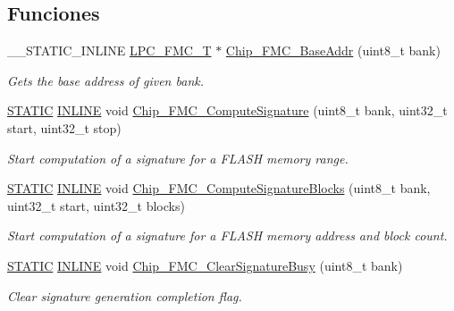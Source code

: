 \subsection*{Funciones}
\begin{DoxyCompactItemize}
\item 
\+\_\+\+\_\+\+S\+T\+A\+T\+I\+C\+\_\+\+I\+N\+L\+I\+NE \hyperlink{struct_l_p_c___f_m_c___t}{L\+P\+C\+\_\+\+F\+M\+C\+\_\+T} $\ast$ \hyperlink{group___f_m_c__18_x_x__43_x_x_ga0108061af4fc0814b1d3e2b5b1fc5579}{Chip\+\_\+\+F\+M\+C\+\_\+\+Base\+Addr} (uint8\+\_\+t bank)
\begin{DoxyCompactList}\small\item\em Gets the base address of given bank. \end{DoxyCompactList}\item 
\hyperlink{group___l_p_c___types___public___macros_ga10b2d890d871e1489bb02b7e70d9bdfb}{S\+T\+A\+T\+IC} \hyperlink{spifi__18xx__43xx_8h_a2eb6f9e0395b47b8d5e3eeae4fe0c116}{I\+N\+L\+I\+NE} void \hyperlink{group___f_m_c__18_x_x__43_x_x_ga743dd8b5f2e568d1bcf6d641b4587a3c}{Chip\+\_\+\+F\+M\+C\+\_\+\+Compute\+Signature} (uint8\+\_\+t bank, uint32\+\_\+t start, uint32\+\_\+t stop)
\begin{DoxyCompactList}\small\item\em Start computation of a signature for a F\+L\+A\+SH memory range. \end{DoxyCompactList}\item 
\hyperlink{group___l_p_c___types___public___macros_ga10b2d890d871e1489bb02b7e70d9bdfb}{S\+T\+A\+T\+IC} \hyperlink{spifi__18xx__43xx_8h_a2eb6f9e0395b47b8d5e3eeae4fe0c116}{I\+N\+L\+I\+NE} void \hyperlink{group___f_m_c__18_x_x__43_x_x_ga413d32194e2866d17bcc98d942fc4dd1}{Chip\+\_\+\+F\+M\+C\+\_\+\+Compute\+Signature\+Blocks} (uint8\+\_\+t bank, uint32\+\_\+t start, uint32\+\_\+t blocks)
\begin{DoxyCompactList}\small\item\em Start computation of a signature for a F\+L\+A\+SH memory address and block count. \end{DoxyCompactList}\item 
\hyperlink{group___l_p_c___types___public___macros_ga10b2d890d871e1489bb02b7e70d9bdfb}{S\+T\+A\+T\+IC} \hyperlink{spifi__18xx__43xx_8h_a2eb6f9e0395b47b8d5e3eeae4fe0c116}{I\+N\+L\+I\+NE} void \hyperlink{group___f_m_c__18_x_x__43_x_x_ga270a1f9bf6a1c70415a84ebd7c0065fe}{Chip\+\_\+\+F\+M\+C\+\_\+\+Clear\+Signature\+Busy} (uint8\+\_\+t bank)
\begin{DoxyCompactList}\small\item\em Clear signature generation completion flag. \end{DoxyCompactList}\item 

\end{DoxyCompactItemize}
